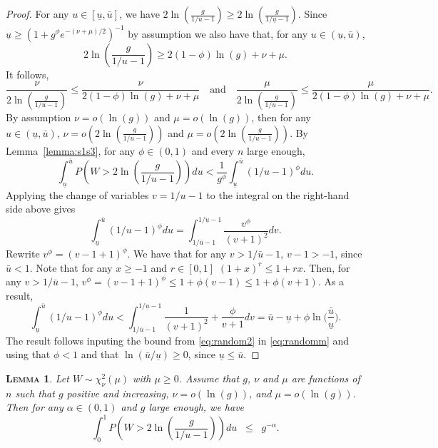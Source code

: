 \documentclass[bj,authoryear]{imsart}
\theoremstyle{plain}
\newtheorem{lem}[thm]{\textsc{Lemma}}
\begin{document}
\begin{proof}
For any $u\in [\underline{u},\bar{u}]$, we have $2\ln \left(\frac{g}{1 / u-1}\right) \geq 2\ln \left(\frac{g}{1 / \underline{u}-1}\right)$. Since $\underline{u}\geq (1+g^{\phi}e^{-(\nu+\mu)/2})^{-1}$ by assumption  we also have that, for any $u\in (\underline{u},\bar{u})$,
$$2\ln \left(\frac{g}{1 / u-1}\right) \geq 2(1-\phi)\ln(g)+\nu+\mu.$$
It follows,
$$\frac{\nu}{2\ln \left(\frac{g}{1 / u-1}\right)}\leq \frac{\nu}{2(1-\phi)\ln(g)+\nu+\mu}
\quad\text{and}\quad
\frac{\mu}{2\ln \left(\frac{g}{1 / u-1}\right)}\leq\frac{\mu}{ 2(1-\phi)\ln(g)+\nu+\mu}.$$
By assumption $\nu=o\left(\ln (g)\right)$ and $\mu=o\left(\ln (g)\right)$, then for any $u\in (\underline{u},\bar{u})$, $\nu=o\left(2\ln \left(\frac{g}{1 / u-1}\right)\right)$ and $\mu=o\left(2\ln \left(\frac{g}{1 / u-1}\right)\right)$. By Lemma~\ref{lemma:s1s3}, for any $\phi\in(0,1)$ and every $n$ large enough,
\begin{equation}\label{eq:randomm}
    \int_{\underline{u}}^{\bar{u}} P\left(W>2\ln \left(\frac{g}{1 / u-1}\right)\right) d u< \frac{1}{g^{\phi}} \int_{\underline{u}}^{\bar{u}}(1 / u-1)^{\phi} d u .
\end{equation}
Applying the change of variables $v=1 / u-1$ to the integral on the right-hand side above gives
$$
\int_{\underline{u}}^{\bar{u}}(1 / u-1)^{\phi} d u=\int_{1 / \bar{u}-1}^{1 / \underline{u}-1} \frac{v^{\phi}}{(v+1)^2} d v.
$$
Rewrite $v^{\phi}=(v-1 + 1)^{\phi}$. We have that for any $v>1 / \bar{u}-1$, $v-1>-1$, since $\bar{u}<1$. Note that for any $x \geq-1$ and $r\in[0,1]$ $(1+x)^r \leq 1+r x$. Then, for any $v>1 / \bar{u}-1$, $v^{\phi}=(v-1 + 1)^{\phi}\leq 1 + \phi (v-1)\leq 1 + \phi(v+1)$. As a result,
\begin{equation}\label{eq:random2}
\int_{\underline{u}}^{\bar{u}}(1 / u-1)^{\phi} d u<\int_{1 / \bar{u}-1}^{1 / \underline{u}-1} \frac{1}{(v+1)^2} +\frac{\phi}{v+1} d v = \bar{u}-\underline{u}+\phi\ln\Big(\frac{\bar{u}}{\underline{u}}\Big).
\end{equation}
The result follows inputing the bound from \eqref{eq:random2} in \eqref{eq:randomm} and using that $\phi<1$ and that $\ln(\bar{u}/\underline{u}) \geq 0$, since $\underline{u} \leq \bar{u}$.
\end{proof}

\begin{lem}\label{lemma:s20}
 Let $W\sim \chi_\nu^2(\mu)$ with $\mu \geq 0$. Assume that $g$, $\nu$ and $\mu$ are functions of $n$ such that $g$ positive and increasing,  $\nu=o(\ln(g))$, and $\mu=o(\ln(g))$. Then for any $\alpha\in(0,1)$ and $g$ large enough, we have
$$
\int_0^1 P\left(W>2 \ln \left(\frac{g}{1 / u-1}\right)\right) d u\;\; \leq\;\;  g^{-\alpha}.$$
\end{lem}
\end{document}
